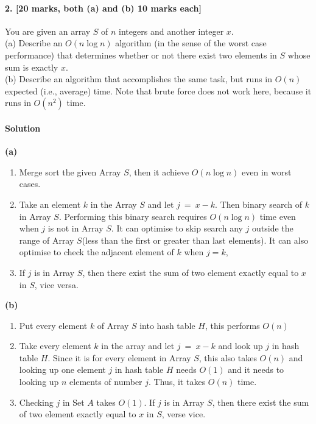 \documentclass[a4paper]{scrartcl}
\begin{document}
\paragraph{2. [20 marks, both (a) and (b) 10 marks each]}
\label{sec:Question 2}
You are given an array $S$ of $n$ integers and
another integer $x$.\\
(a) Describe an $O(n \log{n})$ algorithm (in the sense of the worst case performance) that determines whether or not there exist two elements in $S$ whose sum is exactly $x$.\\
(b) Describe an algorithm that accomplishes the same task, but runs in $O(n)$ expected (i.e., average) time.
Note that brute force does not work here, because it runs in $O(n^2)$ time.

\paragraph{Solution}
{\bfseries(a)}
\begin{enumerate}
  \item Merge sort the given Array $S$, then it achieve $O(n\log{n})$ even in worst cases.
  \item Take an element $k$ in the Array $S$ and let $j\ =\ x-k$. Then binary search of $k$ in Array $S$. Performing this binary search requires $O(n\log{n})$ time even when $j$ is not in Array $S$. It can optimise to skip search any $j$ outside the range of Array $S$(less than the first or greater than last elements). It can also optimise to check the adjacent element of $k$ when $j = k$,
  \item If $j$ is in Array $S$, then there exist the sum of two element exactly equal to $x$ in $S$, vice versa.
\end{enumerate}

{\bfseries(b)}
\begin{enumerate}
 \item Put every element $k$ of Array $S$ into hash table $H$, this performs $O(n)$
 \item Take every element $k$ in the array and let $j\ =\ x-k$ and look up $j$ in hash table $H$. Since it is for every element in Array $S$, this also takes $O(n)$ and looking up one element $j$ in hash table $H$ needs $O(1)$ and it needs to looking up $n$ elements of number $j$. Thus, it takes $O(n)$ time.
 \item Checking $j$ in Set $A$ takes $O(1)$. If $j$ is in Array $S$, then there exist the sum of two element exactly equal to $x$ in $S$, verse vice.
\end{enumerate}
\end{document}
